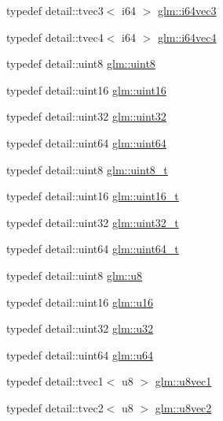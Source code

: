 \begin{DoxyCompactItemize}
typedef detail\+::tvec3$<$ i64 $>$ \hyperlink{group__gtc__type__precision_gaefca6f789bc2d5150fe594a9aa687840}{glm\+::i64vec3}
\item 
typedef detail\+::tvec4$<$ i64 $>$ \hyperlink{group__gtc__type__precision_ga3f5fbc11fb153fa47a858e25ccf1ad27}{glm\+::i64vec4}
\item 
typedef detail\+::uint8 \hyperlink{group__gtc__type__precision_ga1a7dcd8aac97cc8020817c94049deff2}{glm\+::uint8}
\item 
typedef detail\+::uint16 \hyperlink{group__gtc__type__precision_gad8c2939e1fdd8e5828b31d95c52255d5}{glm\+::uint16}
\item 
typedef detail\+::uint32 \hyperlink{group__gtc__type__precision_ga202b6a53c105fcb7e531f9b443518451}{glm\+::uint32}
\item 
typedef detail\+::uint64 \hyperlink{group__gtc__type__precision_gae3632bf9b37da66233d78930dd06378a}{glm\+::uint64}
\item 
typedef detail\+::uint8 \hyperlink{group__gtc__type__precision_ga93adf6dd9803408f3e3aaf9dedda352b}{glm\+::uint8\+\_\+t}
\item 
typedef detail\+::uint16 \hyperlink{group__gtc__type__precision_gac4eb4f43cae8129b00086dc234d3b8fc}{glm\+::uint16\+\_\+t}
\item 
typedef detail\+::uint32 \hyperlink{group__gtc__type__precision_ga822ca53a9ad412504532838906276a99}{glm\+::uint32\+\_\+t}
\item 
typedef detail\+::uint64 \hyperlink{group__gtc__type__precision_ga058f57c19e1befdcf12498944bd73e69}{glm\+::uint64\+\_\+t}
\item 
typedef detail\+::uint8 \hyperlink{group__gtc__type__precision_ga5e3dc67373d5068997d2d9f41c9024d2}{glm\+::u8}
\item 
typedef detail\+::uint16 \hyperlink{group__gtc__type__precision_gae7a1571503f83d2264ddfa705a6b082a}{glm\+::u16}
\item 
typedef detail\+::uint32 \hyperlink{group__gtc__type__precision_ga54e837745059fd29017bed71cfa0a8db}{glm\+::u32}
\item 
typedef detail\+::uint64 \hyperlink{group__gtc__type__precision_ga71cedd4972f9cb1a5e14dfe5ab83ecd7}{glm\+::u64}
\item 
typedef detail\+::tvec1$<$ u8 $>$ \hyperlink{group__gtc__type__precision_gac2309b4040a1432a8e1966b3a163b642}{glm\+::u8vec1}
\item 
typedef detail\+::tvec2$<$ u8 $>$ \hyperlink{group__gtc__type__precision_gaa8ef8673b38c3442eb22bff54c5f0e00}{glm\+::u8vec2}
\item 

\end{DoxyCompactItemize}
